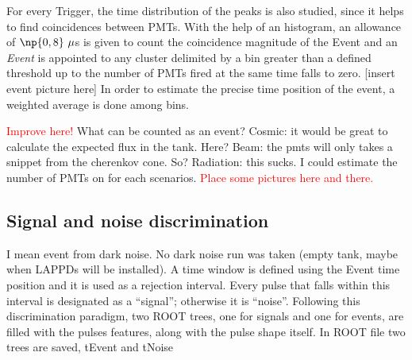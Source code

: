 For every Trigger, the time distribution of the peaks is also studied, since it helps to find %
coincidences between PMTs.
With the help of an histogram, an allowance of $\np{0,8}~\mu$s is given to count the coincidence %
magnitude of the Event and an \emph{Event} is appointed to any cluster delimited by a bin %
greater than a defined threshold up to the number of PMTs fired at the same time falls to zero.
[insert event picture here]
In order to estimate the precise time position of the event, a weighted average is done among bins.

\textcolor{red}{Improve here!}
{\color{blue}
What can be counted as an event?
Cosmic: it would be great to calculate the expected flux in the tank. Here?
Beam: the pmts will only takes a snippet from the cherenkov cone. So?
Radiation: this sucks.
I could estimate the number of PMTs on for each scenarios.
}
\textcolor{red}{Place some pictures here and there.}


\subsection{Signal and noise discrimination}
I mean event from dark noise. No dark noise run was taken (empty tank, maybe when LAPPDs will be %
installed).
A time window is defined using the Event time position and it is used as a rejection interval.
Every pulse that falls within this interval is designated as a ``signal''; otherwise it is ``noise''.
Following this discrimination paradigm, two ROOT trees, one for signals and one for events, %
are filled with the pulses features, along with the pulse shape itself.
In ROOT file two trees are saved, tEvent and tNoise
